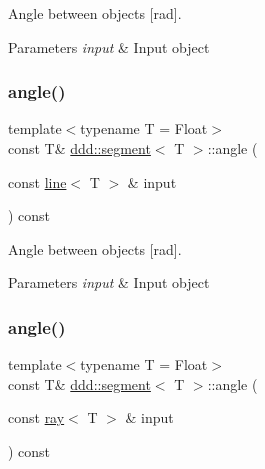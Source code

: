 Angle between objects \mbox{[}rad\mbox{]}. 


\begin{DoxyParams}{Parameters}
{\em input} & Input object \\
\hline
\end{DoxyParams}
\mbox{\label{classddd_1_1segment_a63576e5f0bca9dc67f90a7b246345ff7}} 
\subsubsection{\texorpdfstring{angle()}{angle()}\hspace{0.1cm}{\footnotesize\ttfamily [2/5]}}
{\footnotesize\ttfamily template$<$typename T = Float$>$ \\
const T\& \hyperlink{classddd_1_1segment}{ddd\+::segment}$<$ T $>$\+::angle (\begin{DoxyParamCaption}\item[{const \hyperlink{classddd_1_1line}{line}$<$ T $>$ \&}]{input }\end{DoxyParamCaption}) const\hspace{0.3cm}{\ttfamily [inline]}}



Angle between objects \mbox{[}rad\mbox{]}. 


\begin{DoxyParams}{Parameters}
{\em input} & Input object \\
\hline
\end{DoxyParams}
\mbox{\label{classddd_1_1segment_a5c7ab773bb94ce6e8593a3517765efe2}} 
\subsubsection{\texorpdfstring{angle()}{angle()}\hspace{0.1cm}{\footnotesize\ttfamily [3/5]}}
{\footnotesize\ttfamily template$<$typename T = Float$>$ \\
const T\& \hyperlink{classddd_1_1segment}{ddd\+::segment}$<$ T $>$\+::angle (\begin{DoxyParamCaption}\item[{const \hyperlink{classddd_1_1ray}{ray}$<$ T $>$ \&}]{input }\end{DoxyParamCaption}) const\hspace{0.3cm}{\ttfamily [inline]}}



